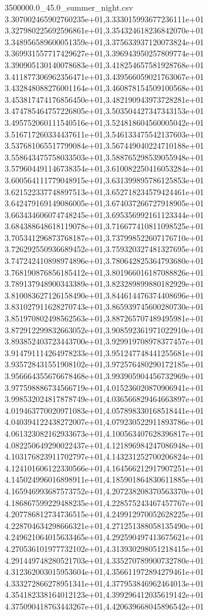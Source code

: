 \begin{filecontents*}{3500000.0_45.0_summer_night.csv}
3.307002465902760235e+01,3.333015993677236111e+01
3.327980225692596861e+01,3.354324618236842070e+01
3.348956589600051359e+01,3.375633937120073824e+01
3.369931557717429627e+01,3.396943950257809774e+01
3.390905130140078683e+01,3.418254657581928768e+01
3.411877306962356471e+01,3.439566059021763067e+01
3.432848088276001164e+01,3.460878154509100568e+01
3.453817474176856450e+01,3.482190943973728281e+01
3.474785464757226805e+01,3.503504427347343153e+01
3.495752060111540516e+01,3.524818604560005042e+01
3.516717260334437611e+01,3.546133475542137603e+01
3.537681065517799084e+01,3.567449040224710188e+01
3.558643475758033503e+01,3.588765298539055948e+01
3.579604491146738354e+01,3.610082250416053284e+01
3.600564111779048915e+01,3.631399895786125853e+01
3.621522337748897513e+01,3.652718234579424461e+01
3.642479169149086005e+01,3.674037266727918905e+01
3.663434606074748245e+01,3.695356992161123344e+01
3.684388648618119078e+01,3.716677410811098525e+01
3.705341296873768187e+01,3.737998522607176710e+01
3.726292550936689452e+01,3.759320327481327695e+01
3.747242410898974896e+01,3.780642825364793680e+01
3.768190876856185412e+01,3.801966016187088826e+01
3.789137948900343389e+01,3.823289899880182929e+01
3.810083627126158490e+01,3.844614476374408696e+01
3.831027911628270743e+01,3.865939745600280730e+01
3.851970802498562563e+01,3.887265707489495981e+01
3.872912299832663052e+01,3.908592361971022910e+01
3.893852403723443700e+01,3.929919708978377457e+01
3.914791114264978233e+01,3.951247748441255681e+01
3.935728431551908102e+01,3.972576480290172185e+01
3.956664355676678468e+01,3.993905904456732969e+01
3.977598886734566719e+01,4.015236020870906941e+01
3.998532024817878749e+01,4.036566829464663897e+01
4.019463770020971083e+01,4.057898330168518441e+01
4.040394122438272007e+01,4.079230522911893786e+01
4.061323082162933673e+01,4.100563407628396817e+01
4.082250649290022437e+01,4.121896984247086948e+01
4.103176823911702797e+01,4.143231252700206824e+01
4.124101606122330566e+01,4.164566212917907251e+01
4.145024996016898911e+01,4.185901864830611885e+01
4.165946993687573752e+01,4.207238208370563370e+01
4.186867599229488235e+01,4.228575243467457767e+01
4.207786812734736515e+01,4.249912970052628225e+01
4.228704634298666321e+01,4.271251388058135490e+01
4.249621064015633465e+01,4.292590497413675621e+01
4.270536101977732102e+01,4.313930298051218415e+01
4.291449748280521703e+01,4.335270789900732780e+01
4.312362003015953604e+01,4.356611972894279461e+01
4.333272866278951341e+01,4.377953846962464013e+01
4.354182338164012123e+01,4.399296412035619142e+01
4.375090418763443267e+01,4.420639668045896542e+01

\end{filecontents*}
